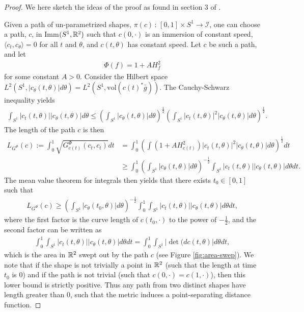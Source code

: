 \begin{proof}
We here sketch the ideas of the proof as found in section 3 of \cite{michor2003riemannian}.

Given a path of un-parametrized shapes, $\pi(c) \, : \, [0,1] \times S^1 \rightarrow \mathcal{I}$, one can choose a path, $c$, in Imm$(S^1, \mathbb{R}^2)$ such that $c(0, \cdot)$ is an immersion of constant speed, $\langle c_t, c_\theta \rangle = 0$ for all $t$ and $\theta$, and $c(t , \theta)$ has constant speed. Let $c$ be such a path, and let
\begin{align*}
\Phi(f) = 1 + A H_f ^2
\end{align*}  
for some constant $A > 0$. Consider the Hilbert space $L^2(S^1, \left| c_\theta(t, \theta) \right| d\theta) = L^2(S^1, \text{vol} (c(t)^* \bar{g}))$. The Cauchy-Schwarz inequality yields
\begin{align*}
\int_{S^1} \left| c_t(t, \theta) \right| \left| c_\theta(t, \theta) \right| d \theta \leq \left(\int_{S^1} \left| c_\theta(t, \theta) \right| d \theta \right) ^{\frac{1}{2}} \left( \int_{S^1} \left| c_t(t, \theta) \right|^2 \left| c_\theta(t, \theta) \right| d \theta   \right) ^{\frac{1}{2}}.
\end{align*} 
The length of the path $c$ is then
\begin{align*}
L_{G^{\Phi}}(c) := \int_0^1  \sqrt{G^{\Phi}_{c(t)}(c_t, c_t)} dt &= \int_0^1 \left( \int (1 + AH_{c(t)}^2 ) \left| c_t(t, \theta) \right|^2 \left| c_\theta(t, \theta) \right| d\theta     \right) ^{\frac{1}{2}} dt \\
& \geq \int_0^1 \left(\int_{S^1} \left| c_\theta(t, \theta) \right| d \theta \right) ^{-\frac{1}{2}} \int_{S^1} \left| c_t(t, \theta) \right| \left| c_\theta(t, \theta) \right| d \theta dt.
\end{align*}
The mean value theorem for integrals then yields that there exists $t_0 \in [0, 1]$ such that
\begin{align*}
L_{G^{\Phi}}(c)\geq  \left(\int_{S^1} \left| c_\theta(t_0, \theta) \right| d \theta \right) ^{-\frac{1}{2}} \int_0^1 \int_{S^1} \left| c_t(t, \theta) \right| \left| c_\theta(t, \theta) \right| d \theta dt,
\end{align*}
where the first factor is the curve length of $c(t_0, \cdot)$ to the power of $-\frac{1}{2}$, and the second factor can be written as
\begin{align*}
\int_0^1 \int_{S^1} \left| c_t(t, \theta) \right| \left| c_\theta(t, \theta) \right| d \theta dt = \int_0^1 \int_{S^1} \left| \det (d c(t, \theta) \right| d \theta dt,
\end{align*}
which is the area in $\mathbb{R}^2$ swept out by the path $c$ (see Figure \ref{fig:area-swep}). We note that if the shape is not trivially a point in $\mathbb{R}^2$ (such that the length at time $t_0$ is $0$) and if the path is not trivial (such that $c(0, \cdot) = c(1, \cdot)$), then this lower bound is strictly positive. Thus any path from two distinct shapes have length greater than $0$, such that the metric induces a point-separating distance function. 
\end{proof}

